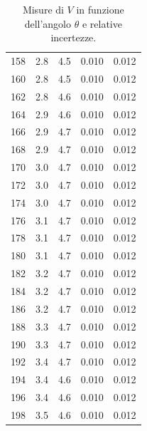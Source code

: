 \documentclass[10pt,twocolumn]{article}
\begin{document}
\begin{table}[!t]
\begin{minipage}[t]{0.48\textwidth}
\begin{tabular}{ccccc}
158 & 2.8 & 4.5 & 0.010 & 0.012 \\
160 & 2.8 & 4.5 & 0.010 & 0.012 \\
162 & 2.8 & 4.6 & 0.010 & 0.012 \\
164 & 2.9 & 4.6 & 0.010 & 0.012 \\
166 & 2.9 & 4.7 & 0.010 & 0.012 \\
168 & 2.9 & 4.7 & 0.010 & 0.012 \\
170 & 3.0 & 4.7 & 0.010 & 0.012 \\
172 & 3.0 & 4.7 & 0.010 & 0.012 \\
174 & 3.0 & 4.7 & 0.010 & 0.012 \\
176 & 3.1 & 4.7 & 0.010 & 0.012 \\
178 & 3.1 & 4.7 & 0.010 & 0.012 \\
180 & 3.1 & 4.7 & 0.010 & 0.012 \\
182 & 3.2 & 4.7 & 0.010 & 0.012 \\
184 & 3.2 & 4.7 & 0.010 & 0.012 \\
186 & 3.2 & 4.7 & 0.010 & 0.012 \\
188 & 3.3 & 4.7 & 0.010 & 0.012 \\
190 & 3.3 & 4.7 & 0.010 & 0.012 \\
192 & 3.4 & 4.7 & 0.010 & 0.012 \\
194 & 3.4 & 4.6 & 0.010 & 0.012 \\
196 & 3.4 & 4.6 & 0.010 & 0.012 \\
198 & 3.5 & 4.6 & 0.010 & 0.012 \\
\bottomrule
\end{tabular}
\end{minipage}
\caption{Misure di $V$ in funzione dell'angolo $\theta$ e relative incertezze.}
\end{table}
 
\end{document}
